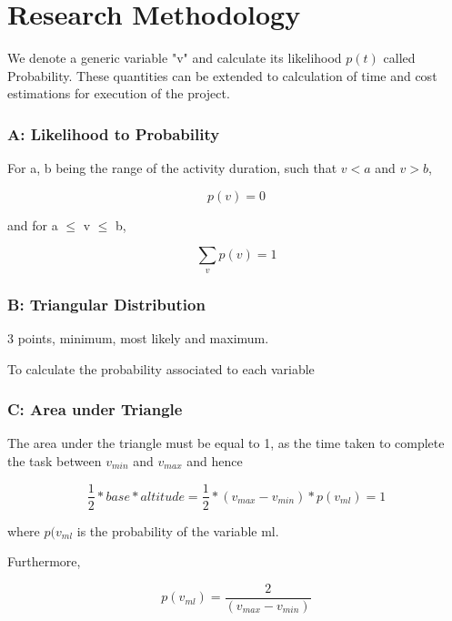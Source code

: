 \let\textcircled=\pgftextcircled
\chapter{Research Methodology}
\label{chap:RM}

We denote a generic variable "v" and calculate its likelihood $p(t)$ called Probability. These quantities can be extended to calculation of time and cost estimations for execution of the project. 

\subsection{A: Likelihood to Probability}
For a, b being the range of the activity duration, such that $v < a$ and $v > b$,

\begin{equation}
	p(v)  = 0 
\end{equation}

and for  a $\leqslant$ v $\leqslant$ b,

\begin{equation}
\sum_{v} p(v) = 1
\end{equation}


\subsection{B: Triangular Distribution}

3 points, minimum, most likely and maximum.

To calculate the probability associated to each variable 


\subsection{C: Area under Triangle}

The area under the triangle must be equal to 1, as the time taken to complete the task between $ v_{min} $ and $ v_{max} $ and hence 

\begin{equation}
\frac{1}{2} * base * altitude = \frac{1}{2} * (v_{max} - v_{min} ) * p(v_{ml}) = 1
\label{eqn3}
\end{equation}

where $p(v_{ml} $ is the probability of the variable ml.

Furthermore,


\begin{equation}
p(v_{ml}) = \frac{2}{  (v_{max} - v_{min})} 
\label{eqn4}
\end{equation}

